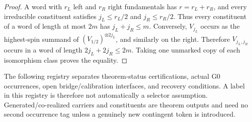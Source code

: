 \documentclass[12pt,a4paper]{article}
\begin{document}
\begin{proof}
A word with \(r_L\) left and \(r_R\) right fundamentals has
\(r=r_L+r_R\), and every irreducible constituent satisfies
\(j_L\le r_L/2\) and \(j_R\le r_R/2\).  Thus every constituent of a word of
length at most \(2m\) has \(j_L+j_R\le m\).  Conversely,
\(V_{j_L}\) occurs as the highest-spin summand of
\((V_{1/2})^{\otimes 2j_L}\), and similarly on the right.  Therefore
\(V_{j_L,j_R}\) occurs in a word of length
\(2j_L+2j_R\le2m\).  Taking one unmarked copy of each isomorphism class proves
the equality.
\end{proof}

\begin{definition}
\label{p2:def:level-tags}
The following registry separates theorem-status certifications, actual G0
occurrences, open bridge/calibration interfaces, and recovery conditions.  A
label in this registry is therefore not automatically a selector assumption.
Generated/co-realized carriers and constituents are theorem outputs and need no
second occurrence tag unless a genuinely new contingent token is introduced.


\end{definition}
\end{document}
